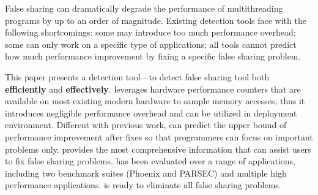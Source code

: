 False sharing can dramatically degrade the performance of multithreading programs by up to an order of magnitude. 
Existing detection tools face with the following shortcomings: some may introduce too much performance overhead; some can only work on a specific type of applications; all tools cannot predict how much performance improvement by fixing a specific false sharing problem. 

This paper presents a detection tool--\cheetah{}--to detect false sharing tool both {\bf efficiently} and {\bf effectively}. \cheetah{} leverages hardware performance counters that are available on most existing modern hardware to sample memory accesses, thus it introduces negligible performance overhead and can be utilized in deployment environment. Different with previous work, \cheetah{} can predict the upper bound of performance improvement after fixes so that programmers can focus on important problems only. \cheetah{} provides the most comprehensive information that can assist users to fix false sharing problems. \cheetah{} has been evaluated over a range of applications, including two benchmark suites (Phoenix and PARSEC) and multiple high performance applications. \Cheetah{} is ready to eliminate all false sharing problems.  